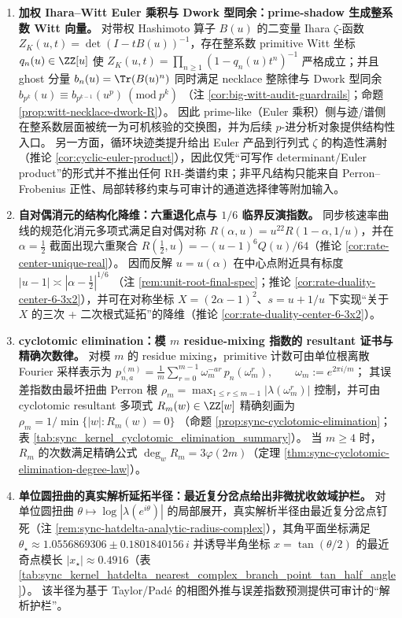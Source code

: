 \begin{enumerate}
  \item \textbf{加权 Ihara--Witt Euler 乘积与 Dwork 型同余：prime-shadow 生成整系数 Witt 向量。}
  对带权 Hashimoto 算子 \(B(u)\) 的二变量 Ihara \(\zeta\)-函数 \(Z_K(u,t)=\det(I-tB(u))^{-1}\)，存在整系数 primitive Witt 坐标 \(q_n(u)\in\ZZ[u]\) 使
  \(
  Z_K(u,t)=\prod_{n\ge 1}(1-q_n(u)t^n)^{-1}
  \)
  严格成立；并且 ghost 分量 \(b_n(u)=\Tr(B(u)^n)\) 同时满足 necklace 整除律与 Dwork 型同余
  \(b_{p^k}(u)\equiv b_{p^{k-1}}(u^p)\ (\mathrm{mod}\ p^k)\)
  （注 \ref{cor:big-witt-audit-guardrails}；命题 \ref{prop:witt-necklace-dwork-R}）。
  因此 prime-like（Euler 乘积）侧与迹/谱侧在整系数层面被统一为可机核验的交换图，并为后续 \(p\)-进分析对象提供结构性入口。
  另一方面，循环块迹类提升给出 Euler 产品到行列式 \(\zeta\) 的构造性满射（推论 \ref{cor:cyclic-euler-product}），因此仅凭“可写作 determinant/Euler product”的形式并不推出任何 RH-类谱约束；非平凡结构只能来自 Perron--Frobenius 正性、局部转移约束与可审计的通道选择律等附加输入。

  \item \textbf{自对偶消元的结构化降维：六重退化点与 \texorpdfstring{$1/6$}{1/6} 临界反演指数。}
  同步核速率曲线的规范化消元多项式满足自对偶对称 \(R(\alpha,u)=u^{22}R(1-\alpha,1/u)\)，并在 \(\alpha=\tfrac12\) 截面出现六重聚合
  \(R(\tfrac12,u)=-(u-1)^6Q(u)/64\)（推论 \ref{cor:rate-center-unique-real}）。
  因而反解 \(u=u(\alpha)\) 在中心点附近具有标度
  \(
  |u-1|\asymp|\alpha-\tfrac12|^{1/6}
  \)
  （注 \ref{rem:unit-root-final-spec}；推论 \ref{cor:rate-duality-center-6-3x2}），并可在对称坐标 \(X=(2\alpha-1)^2\)、\(s=u+1/u\) 下实现“关于 \(X\) 的三次 + 二次根式延拓”的降维（推论 \ref{cor:rate-duality-center-6-3x2}）。

  \item \textbf{cyclotomic elimination：模 \texorpdfstring{$m$}{m} residue-mixing 指数的 resultant 证书与精确次数律。}
  对模 \(m\) 的 residue mixing，primitive 计数可由单位根离散 Fourier 采样表示为
  \(
  p_{n,a}^{(m)}=\frac1m\sum_{r=0}^{m-1}\omega_m^{-ar}\,p_n(\omega_m^r),\qquad \omega_m:=e^{2\pi i/m}
  \)；
  其误差指数由最坏扭曲 Perron 根 \(\rho_m=\max_{1\le r\le m-1}|\lambda(\omega_m^r)|\) 控制，并可由 cyclotomic resultant 多项式 \(R_m(w)\in\ZZ[w]\) 精确刻画为
  \(
  \rho_m=1/\min\{|w|:R_m(w)=0\}
  \)
  （命题 \ref{prop:sync-cyclotomic-elimination}；表 \ref{tab:sync_kernel_cyclotomic_elimination_summary}）。
  当 \(m\ge 4\) 时，\(R_m\) 的次数满足精确公式 \(\deg_w R_m=3\varphi(2m)\)（定理 \ref{thm:sync-cyclotomic-elimination-degree-law}）。

  \item \textbf{单位圆扭曲的真实解析延拓半径：最近复分岔点给出非微扰收敛域护栏。}
  对单位圆扭曲 \(\theta\mapsto\log|\lambda(e^{i\theta})|\) 的局部展开，真实解析半径由最近复分岔点钉死（注 \ref{rem:sync-hatdelta-analytic-radius-complex}），其角平面坐标满足
  \(
  \theta_\star\approx 1.0556869306\pm 0.1801840156\,i
  \)
  并诱导半角坐标 \(x=\tan(\theta/2)\) 的最近奇点模长 \(|x_\star|\approx 0.4916\)（表 \ref{tab:sync_kernel_hatdelta_nearest_complex_branch_point_tan_half_angle}）。
  该半径为基于 Taylor/Pad\'e 的相图外推与误差指数预测提供可审计的“解析护栏”。


\end{enumerate}
